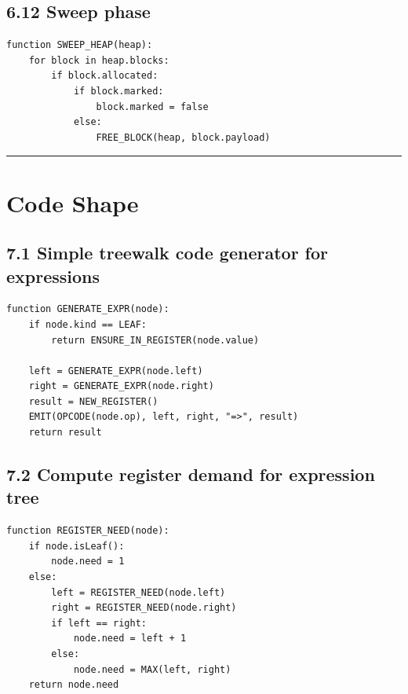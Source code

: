 \documentclass[10pt,letterpaper]{article}
\begin{document}
\subsection*{6.12 Sweep phase}

\begin{verbatim}
function SWEEP_HEAP(heap):
    for block in heap.blocks:
        if block.allocated:
            if block.marked:
                block.marked = false
            else:
                FREE_BLOCK(heap, block.payload)
\end{verbatim}

\medskip\hrule\medskip

\clearpage
\section{Code Shape}

\subsection*{7.1 Simple treewalk code generator for expressions}

\begin{verbatim}
function GENERATE_EXPR(node):
    if node.kind == LEAF:
        return ENSURE_IN_REGISTER(node.value)

    left = GENERATE_EXPR(node.left)
    right = GENERATE_EXPR(node.right)
    result = NEW_REGISTER()
    EMIT(OPCODE(node.op), left, right, "=>", result)
    return result
\end{verbatim}

\subsection*{7.2 Compute register demand for expression tree}

\begin{verbatim}
function REGISTER_NEED(node):
    if node.isLeaf():
        node.need = 1
    else:
        left = REGISTER_NEED(node.left)
        right = REGISTER_NEED(node.right)
        if left == right:
            node.need = left + 1
        else:
            node.need = MAX(left, right)
    return node.need
\end{verbatim}
\end{document}
